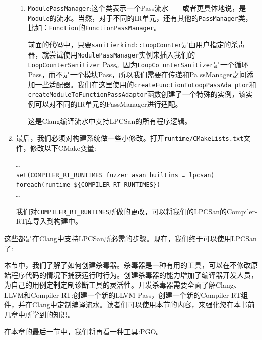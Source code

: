 \begin{enumerate}
\begin{enumerate}[label=\roman*.]
\item \texttt{ModulePassManager}:这个类表示一个Pass流水——或者更具体地说，是\texttt{Module}的流水。当然，对于不同的IR单元，还有其他的\texttt{PassManager}类，比如：\texttt{Function}的\texttt{FunctionPassManager}。

前面的代码中，只要\texttt{sanitierkind::LoopCounter}是由用户指定的杀毒器，就尝试使用\texttt{ModulePassManager}实例来插入我们的\texttt{LoopCounterSanitizer} Pass。因为\texttt{LoopCo unterSanitizer}是一个循环Pass，而不是一个模块Pass，所以我们需要在传递和Pa ssManager之间添加一些适配器。我们在这里使用的\texttt{createFunctionToLoopPassAda ptor}和\texttt{createModuleToFunctionPassAdaptor}函数创建了一个特殊的实例，该实例可以对不同的IR单元的PassManager进行适配。

这是Clang编译流水中支持LPCSan的所有程序逻辑。
\end{enumerate}

\item 最后，我们必须对构建系统做一些小修改。打开\texttt{runtime/CMakeLists.txt}文件，修改以下CMake变量:

\begin{lstlisting}[style=styleCMake]
…
set(COMPILER_RT_RUNTIMES fuzzer asan builtins … lpcsan)
foreach(runtime ${COMPILER_RT_RUNTIMES})
…
\end{lstlisting}

我们对\texttt{COMPILER\_RT\_RUNTIMES}所做的更改，可以将我们的LPCSan的Compiler-RT库导入到构建中。


\end{enumerate}

这些都是在Clang中支持LPCSan所必需的步骤。现在，我们终于可以使用LPCSan了:


本节中，我们了解了如何创建杀毒器。杀毒器是一种有用的工具，可以在不修改原始程序代码的情况下捕获运行时行为。创建杀毒器的能力增加了编译器开发人员，为自己的用例定制定制诊断工具的灵活性。开发杀毒器需要全面了解Clang、LLVM和Compiler-RT:创建一个新的LLVM Pass，创建一个新的Compiler-RT组件，并在Clang中定制编译流水。读者们可以使用本节的内容，来强化您在本书前几章中所学到的知识。

在本章的最后一节中，我们将再看一种工具:PGO。
















